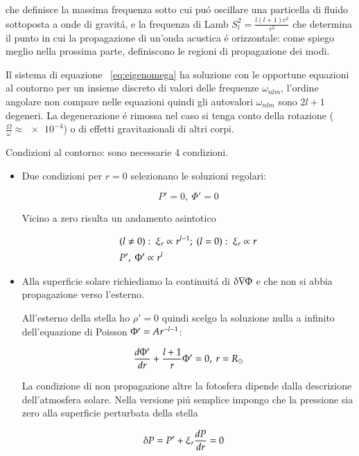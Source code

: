 \documentclass[oneside,12pt]{memoir}
\begin{document}
che definisce la massima frequenza sotto cui pu\'o oscillare una particella di fluido sottoposta a onde di gravit\'a, e la frequenza di Lamb $S_l^2=\frac{l(l+1)c^2}{r^2}$ che determina il punto in cui la propagazione di un'onda acustica \'e orizzontale: come spiego meglio nella prossima parte, definiscono le regioni di propagazione dei modi.

Il sistema di equazione ~\eqref{eq:eigenomega} ha soluzione con le opportune equazioni al contorno per un insieme discreto di valori delle frequenze $\omega_{nlm}$, l'ordine angolare non compare nelle equazioni quindi gli autovalori $\omega_{nlm}$ sono $2l+1$ degeneri. La degenerazione \'e rimossa nel caso si tenga conto della rotazione ($\frac{\Omega}{\omega}\approx\num{e-4}$) o di effetti gravitazionali di altri corpi.


Condizioni al contorno: sono necessarie 4 condizioni.

\begin{itemize}
\item Due condizioni per $r=0$ selezionano le soluzioni regolari:

\begin{equation}
P'=0,\ \Phi'=0
\end{equation}

Vicino a zero risulta un andamento asintotico

\begin{align*}
&(l\neq0):\ \xi_r\propto r\expy{l-1};\ (l=0):\ \xi_r\propto r\\
&P',\ \Phi'\propto r^l
\end{align*}

\item Alla superficie solare richiediamo la continuit\'a di $\Lvar{\nabla\Phi}$ e che non si abbia propagazione verso l'esterno.

All'esterno della stella ho $\rho'=0$ quindi scelgo la soluzione nulla a infinito dell'equazione di Poisson $\Phi'=Ar\expy{-l-1}$:

\begin{equation}
\TDy{r}{\Phi'}+\frac{l+1}{r}\Phi'=0,\ r=\rsun{}    
\end{equation}

La condizione di non propagazione altre la fotosfera dipende dalla descrizione dell'atmosfera solare. Nella versione pi\'u semplice impongo che la pressione sia zero alla superficie perturbata della stella

\begin{align}
&\Lvar{P}=P'+\xi_r\TDy{r}{P}=0
\end{align}

\end{itemize}
\end{document}
